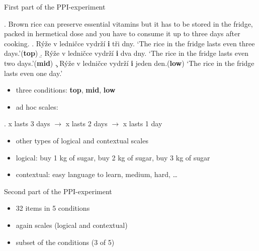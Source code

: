 \documentclass[ignorenonframetext,]{beamer}
\providecommand{\tightlist}{%
  \setlength{\itemsep}{0pt}\setlength{\parskip}{0pt}}
\newcommand{\cond}[1]{\textbf{#1}}
\begin{document}
\begin{frame}{First part of the PPI-experiment}

\ex. Brown rice can preserve essential vitamins but it has to be stored
in the fridge, packed in hermetical dose and you have to consume it up
to three days after cooking.\label{ex-1} \a. Rýže v ledničce vydrží
\textbf{i} tři dny. \label{ex-1-a}\newline
`The rice in the fridge lasts even three days.'\hfill (\cond{top}) \b.
Rýže v ledničce vydrží \textbf{i} dva dny.\label{ex-1-b}\newline
`The rice in the fridge lasts even two days.'\hfill (\cond{mid}) \c.
Rýže v ledničce vydrží \textbf{i} jeden
den.\hfill (\cond{low})\label{ex-1-c}\newline
`The rice in the fridge lasts even one day.'

\end{frame}

\begin{frame}

\begin{itemize}
\tightlist
\item
  three conditions: \textbf{top}, \textbf{mid}, \textbf{low}
\item
  ad hoc scales:
\end{itemize}

\ex. x lasts 3 days \(\rightarrow\) x lasts 2 days \(\rightarrow\) x
lasts 1 day

\begin{itemize}
\tightlist
\item
  other types of logical and contextual scales
\item
  logical: buy 1 kg of sugar, buy 2 kg of sugar, buy 3 kg of sugar
\item
  contextual: easy language to learn, medium, hard, \ldots
\end{itemize}

\end{frame}

\begin{frame}{Second part of the PPI-experiment}

\begin{itemize}
\tightlist
\item
  32 items in 5 conditions
\item
  again scales (logical and contextual)
\item
  subset of the conditions (3 of 5)
\end{itemize}

\end{frame}
\end{document}

